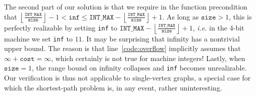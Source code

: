 The second part of our solution is that we require in the function precondition that $\left\lfloor \frac{\texttt{INT\_MAX}}{\texttt{size}} \right\rfloor - 1 < \texttt{inf} \le \texttt{INT\_MAX} - \left\lfloor \frac{\texttt{INT\_MAX}}{\texttt{size}} \right\rfloor + 1$.  As long as $\texttt{size} > 1$, this is perfectly realizable  by setting \texttt{inf} to $\texttt{INT\_MAX} - \left\lfloor \frac{\texttt{INT\_MAX}}{\texttt{size}} \right\rfloor + 1$, \emph{i.e.} in the 4-bit machine we set \texttt{inf} to $11$.  It may be surprising that infinity has a nontrivial upper bound.  The reason is that line~\ref{code:overflow} implicitly assumes that $\infty + \texttt{cost} = \infty$, which certainly is not true for machine integers!
Lastly, when $\texttt{size} = 1$, the range bound on infinity collapses and \texttt{inf} becomes unrealizable.  
Our verification is thus not applicable to single-vertex graphs, a special case for which the shortest-path problem is, in any event, rather uninteresting.
